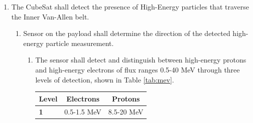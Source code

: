 \begin{enumerate}
        \begin{enumerate}
            \item The components of CubeSat shall be tested to assure they are functioning initially, function throughout a normal cycle, and functioning before launch. 
                \begin{enumerate}
                    \item The CubeSat shall rectify electronic problems caused by radiation or alert the team of known errors. 
                        \begin{itemize}
                            \item Motivation:  In the case of a SEE, the CubeSat must either fix itself by resetting hardware or signal the error so it can be accounted for in data processing.
                            \item Verification: If proton beam testing is available, then the system can be tested to assure solutions exist. If not, then the systems for repair must be put in place and tested synthetically. 
                        \end{itemize}
                \end{enumerate}
        \end{enumerate} %
        \item The CubeSat shall detect the presence of High-Energy particles that traverse the Inner Van-Allen belt.
            \begin{enumerate}
                \item Sensor on the payload shall determine the direction of the detected high-energy particle measurement.
                    \begin{enumerate}
                        \item The sensor shall detect and distinguish between high-energy protons and high-energy electrons of flux ranges 0.5-40 MeV through three levels of detection, shown in Table \ref{tab:mev}.
                        \begin{table}[H]
                        \centering
                        \begin{tabular}{|l|c|c|} 
                        \hline
                        \textbf{Level} & \textbf{Electrons} & \textbf{Protons}
                        \\
                        \hline
                        \textbf{1} & 0.5-1.5 MeV & 8.5-20 MeV
                        \\
                        \hline

\end{tabular}
\end{table}
\end{enumerate}
\end{enumerate}
\end{enumerate}

